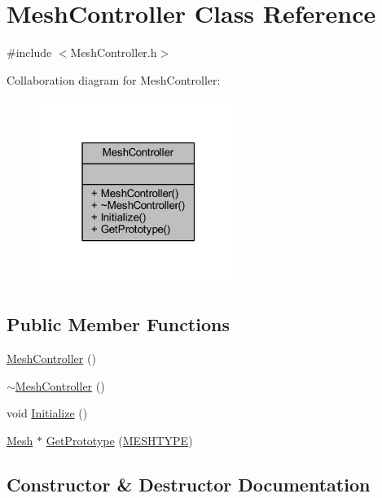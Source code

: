 \hypertarget{class_mesh_controller}{}\section{Mesh\+Controller Class Reference}
\label{class_mesh_controller}


{\ttfamily \#include $<$Mesh\+Controller.\+h$>$}



Collaboration diagram for Mesh\+Controller\+:
\nopagebreak
\begin{figure}[H]
\begin{center}
\leavevmode
\includegraphics[width=183pt]{class_mesh_controller__coll__graph}
\end{center}
\end{figure}
\subsection*{Public Member Functions}
\begin{DoxyCompactItemize}
\item 
\mbox{\hyperlink{class_mesh_controller_a3ba0b33a70c6f9671e6d23953928422d}{Mesh\+Controller}} ()
\item 
\mbox{\hyperlink{class_mesh_controller_a674b1738fffaaed8f77970c8ab1c70f8}{$\sim$\+Mesh\+Controller}} ()
\item 
void \mbox{\hyperlink{class_mesh_controller_a7ea29b746017730e12c78dd8ca62e7e6}{Initialize}} ()
\item 
\mbox{\hyperlink{class_mesh}{Mesh}} $\ast$ \mbox{\hyperlink{class_mesh_controller_ad0bee88b35217e415e62a7183ca148a6}{Get\+Prototype}} (\mbox{\hyperlink{_abstract_factory_2_abstract_factory_2builder_2_mesh_builder_8h_ad6436347ddb93aed826a19081b53dd61}{M\+E\+S\+H\+T\+Y\+PE}})
\end{DoxyCompactItemize}


\subsection{Constructor \& Destructor Documentation}
\mbox{\label{class_mesh_controller_a3ba0b33a70c6f9671e6d23953928422d}} 

